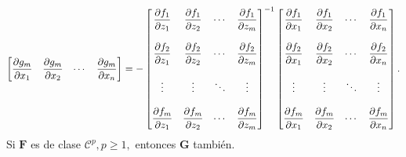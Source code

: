 \begin{theorem}
\[\begin{bmatrix}
                \dfrac{\partial g_m}{\partial x_1} & \dfrac{\partial g_m}{\partial x_2} & \cdots & \dfrac{\partial g_m}{\partial x_n}
                \end{bmatrix} =
 -\begin{bmatrix} 
                \dfrac{\partial f_1}{\partial z_1} & \dfrac{\partial f_1}{\partial z_2} & \cdots & \dfrac{\partial f_1}{\partial z_m} \\
                               &                &        &                \\
                \dfrac{\partial f_2}{\partial z_1} & \dfrac{\partial f_2}{\partial z_2} & \cdots & \dfrac{\partial f_2}{\partial z_m} \\
                               &                &        &                \\
                 \vdots         &  \vdots        & \ddots & \vdots         \\
                               &                &        &                \\
                \dfrac{\partial f_m}{\partial z_1} & \dfrac{\partial f_m}{\partial z_2} & \cdots & \dfrac{\partial f_m}{\partial z_m}
                \end{bmatrix}^{-1}
  \begin{bmatrix} 
                \dfrac{\partial f_1}{\partial x_1} & \dfrac{\partial f_1}{\partial x_2} & \cdots & \dfrac{\partial f_1}{\partial x_n} \\
                               &                &        &                \\
                \dfrac{\partial f_2}{\partial x_1} & \dfrac{\partial f_2}{\partial x_2} & \cdots & \dfrac{\partial f_2}{\partial x_n} \\
                               &                &        &                \\
                 \vdots         &  \vdots        & \ddots & \vdots         \\
                               &                &        &                \\
                \dfrac{\partial f_m}{\partial x_1} & \dfrac{\partial f_m}{\partial x_2} & \cdots & \dfrac{\partial f_m}{\partial x_n}
                \end{bmatrix}.            
 \]
Si $\mathbf{F}$ es de clase $\mathcal{C}^p, p \ge 1,$ entonces $\mathbf{G}$ tambi\'en.
 
\end{theorem}



  
 